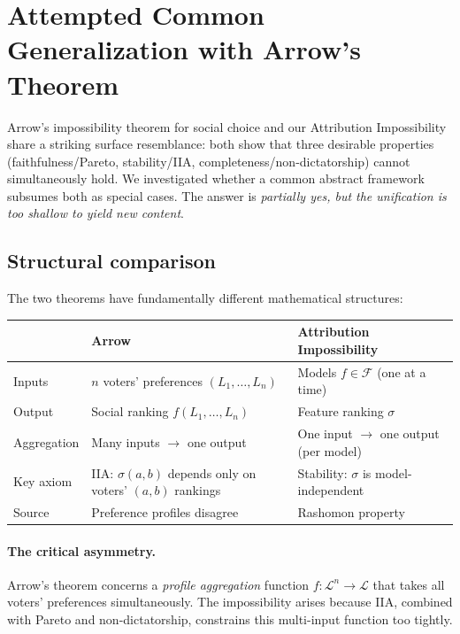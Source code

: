 \documentclass{article}
\begin{document}
\section{Attempted Common Generalization with Arrow's Theorem}
\label{sec:arrow-generalization}

Arrow's impossibility theorem for social choice and our Attribution
Impossibility share a striking surface resemblance:
both show that three desirable properties (faithfulness/Pareto,
stability/IIA, completeness/non-dictatorship) cannot simultaneously
hold. We investigated whether a common abstract framework subsumes both
as special cases. The answer is \emph{partially yes, but the unification
is too shallow to yield new content}.

\subsection{Structural comparison}

The two theorems have fundamentally different mathematical structures:

\begin{center}
\small
\begin{tabular}{@{}lp{5cm}p{5.5cm}@{}}
\toprule
& \textbf{Arrow} & \textbf{Attribution Impossibility} \\
\midrule
Inputs & $n$ voters' preferences $(L_1, \ldots, L_n)$ & Models $f \in \mathcal{F}$ (one at a time) \\
Output & Social ranking $f(L_1, \ldots, L_n)$ & Feature ranking $\sigma$ \\
Aggregation & Many inputs $\to$ one output & One input $\to$ one output (per model) \\
Key axiom & IIA: $\sigma(a,b)$ depends only on voters' $(a,b)$ rankings & Stability: $\sigma$ is model-independent \\
Source & Preference profiles disagree & Rashomon property \\
\bottomrule
\end{tabular}
\end{center}

\paragraph{The critical asymmetry.}
Arrow's theorem concerns a \emph{profile aggregation} function
$f \colon \mathcal{L}^n \to \mathcal{L}$ that takes all voters'
preferences simultaneously. The impossibility arises because IIA,
combined with Pareto and non-dictatorship, constrains this multi-input
function too tightly.
\end{document}
